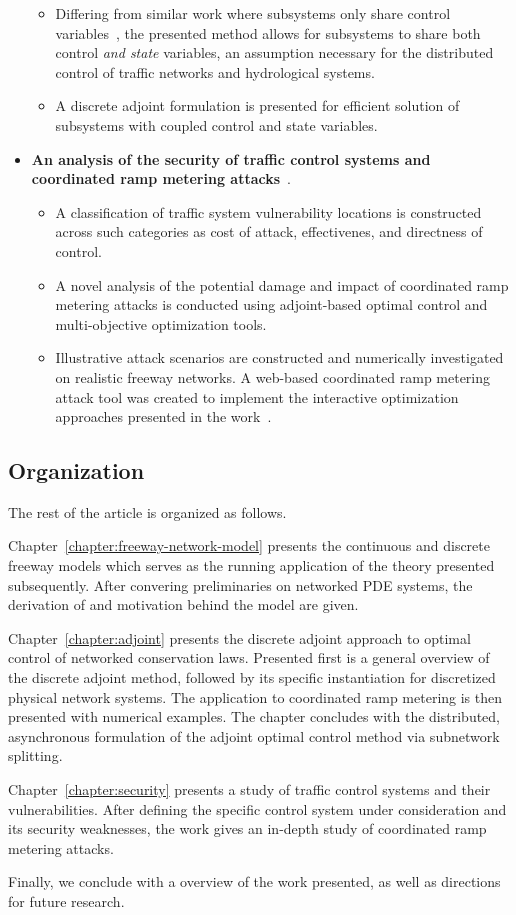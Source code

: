 \begin{itemize}
\begin{itemize}
		\item Differing from similar work where subsystems only share control variables~\cite{mota2012distributed,camponogara2009distributed}, the presented method allows for subsystems to share both control \emph{and state} variables, an assumption necessary for the distributed control of traffic networks and hydrological systems.
		\item A discrete adjoint formulation is presented for efficient solution of subsystems with coupled control and state variables.
	\end{itemize}
	\item \textbf{An analysis of the security of traffic control systems and coordinated ramp metering attacks}~\cite{Reilly2014c,Reilly2014a}.
	\begin{itemize}
		\item A classification of traffic system vulnerability locations is constructed across such categories as cost of attack, effectivenes, and directness of control.
		\item A novel analysis of the potential damage and impact of coordinated ramp metering attacks is conducted using adjoint-based optimal control and multi-objective optimization tools.
		\item Illustrative attack scenarios are constructed and numerically investigated on realistic freeway networks. A web-based coordinated ramp metering attack tool was created to implement the interactive optimization approaches presented in the work~\cite{smartroadswebsite}.
	\end{itemize}
\end{itemize}

\subsection{Organization}
\label{sec:organization}

The rest of the article is organized as follows.

Chapter~\ref{chapter:freeway-network-model} presents the continuous and discrete freeway models which serves as the running application of the theory presented subsequently.  After convering preliminaries on networked PDE systems, the derivation of and motivation behind the model are given.

Chapter~\ref{chapter:adjoint} presents the discrete adjoint approach to optimal control of networked conservation laws. Presented first is a general overview of the discrete adjoint method, followed by its specific instantiation for discretized physical network systems. The application to coordinated ramp metering is then presented with numerical examples. The chapter concludes with the distributed, asynchronous formulation of the adjoint optimal control method via subnetwork splitting.

Chapter~\ref{chapter:security} presents a study of traffic control systems and their vulnerabilities. After defining the specific control system under consideration and its security weaknesses, the work gives an in-depth study of coordinated ramp metering attacks.

Finally, we conclude with a overview of the work presented, as well as directions for future research.